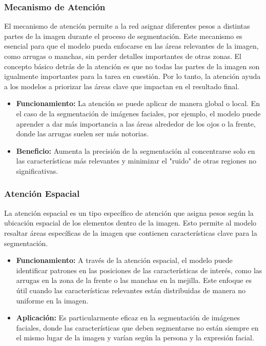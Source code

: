 \subsubsection{Mecanismo de Atención}  
El mecanismo de atención permite a la red asignar diferentes pesos a distintas partes de la imagen durante el proceso de segmentación. Este mecanismo es esencial para que el modelo pueda enfocarse en las áreas relevantes de la imagen, como arrugas o manchas, sin perder detalles importantes de otras zonas. El concepto básico detrás de la atención es que no todas las partes de la imagen son igualmente importantes para la tarea en cuestión. Por lo tanto, la atención ayuda a los modelos a priorizar las áreas clave que impactan en el resultado final.  
\begin{itemize}
    \item \textbf{Funcionamiento:} La atención se puede aplicar de manera global o local. En el caso de la segmentación de imágenes faciales, por ejemplo, el modelo puede aprender a dar más importancia a las áreas alrededor de los ojos o la frente, donde las arrugas suelen ser más notorias.
    \item \textbf{Beneficio:} Aumenta la precisión de la segmentación al concentrarse solo en las características más relevantes y minimizar el "ruido" de otras regiones no significativas. \parencite{autor2021atencion}
\end{itemize}

\subsubsection{Atención Espacial}  
La atención espacial es un tipo específico de atención que asigna pesos según la ubicación espacial de los elementos dentro de la imagen. Esto permite al modelo resaltar áreas específicas de la imagen que contienen características clave para la segmentación.  
\begin{itemize}
    \item \textbf{Funcionamiento:} A través de la atención espacial, el modelo puede identificar patrones en las posiciones de las características de interés, como las arrugas en la zona de la frente o las manchas en la mejilla. Este enfoque es útil cuando las características relevantes están distribuidas de manera no uniforme en la imagen.
    \item \textbf{Aplicación:} Es particularmente eficaz en la segmentación de imágenes faciales, donde las características que deben segmentarse no están siempre en el mismo lugar de la imagen y varían según la persona y la expresión facial. \parencite{autor2020spa}
\end{itemize}


